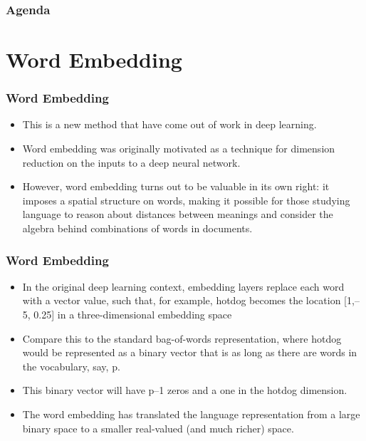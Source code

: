 \documentclass[
  shownotes,
  xcolor={svgnames},
  hyperref={colorlinks,citecolor=DarkBlue,linkcolor=DarkRed,urlcolor=DarkBlue}
  , aspectratio=169]{beamer}
\begin{document}

\begin{frame}
\frametitle{Agenda}

\tableofcontents

\end{frame}

\section{Word Embedding }
\begin{frame}
\frametitle{Word Embedding }

\begin{itemize}
\item This is a new method  that have come out of work in deep learning. 
\medskip
\item Word embedding was originally motivated as a technique for dimension reduction on the inputs to a deep neural network. 
\medskip
\medskip
\item However, word embedding turns out to be valuable in its own right: it imposes a spatial structure on words, making it possible for those studying language to reason about distances between meanings and consider the algebra behind combinations of words in documents. 


\end{itemize}




\end{frame}
\begin{frame}
\frametitle{Word Embedding }

\begin{itemize}
  \item In the original deep learning context, embedding layers replace each word with a vector value, such that, for example, hotdog becomes the location [1,–5, 0.25] in a three-dimensional embedding space%
  \item Compare this to the standard bag-of-words representation, where hotdog would be represented as a binary vector that is as long as there are words in the vocabulary, say, p. 
  \medskip
  \item This binary vector will have p–1 zeros and a one in the hotdog dimension. 
  \medskip
  \item The word embedding has translated the language representation from a large binary space to a smaller real-valued (and much richer) space. 
\end{itemize}


\end{frame}
\end{document}
